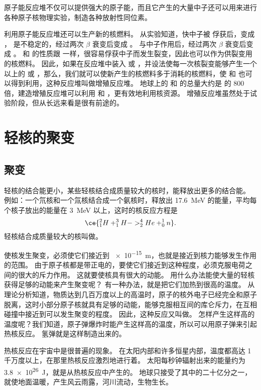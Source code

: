 原子能反应堆不仅可以提供强大的原子能，而且它产生的大量中子还可以用来进行各种原子核物理实验，制造各种放射性同位素。

利用原子能反应堆还可以生产新的核燃料。
从实验知道，快中子被  俘获后，变成 ，  是不稳定的，经过两次 $\beta$ 衰变后变成 。
 与中子作用后，经过两次 $\beta$ 衰变后变成 。
 和  的性质跟  一样，很容易俘获中子而发生裂变，因此也可以作为供裂变用的核燃料。
因此，如果在反应堆中装入  或 ，并设法使每一次核裂变能够产生一个以上的  或 ，那么，我们就可以使新产生的核燃料多于消耗的核燃料，使  和  也可以得到利用，这种反应堆叫做增殖反应堆。
地球上的  和  的总量大约是  的 800 倍，建造增殖反应堆可以利用  和 ，更有效地利用核资源。
增殖反应堆虽然处于试验阶段，但从长远来看是很有前途的。

\section{轻核的聚变}
\subsection{聚变}
轻核的结合能更小，某些轻核结合成质量较大的核时，能释放出更多的结合能。
例如：一个氘核和一个氚核结合成一个氨核时，释放出 \qty{17.6}{MeV} 的能量，平均每个核子放出的能量在 \qty{3}{MeV} 以上，这时的核反应方程是
\[ \ce{ ^2_1H + ^3_1H -> ^4_2He + ^1_0n }.\]
轻核结合成质量较大的核叫做。

使核发生聚变，必须使它们接近到 \qty{e-15}{m}，也就是接近到核力能够发生作用的范围。
由于原子核都是带正电的，要使它们接近到这种程度，必须克服电荷之间的很大的斥力作用。
这就要使核具有很大的动能。
用什么办法能使大量的轻核获得足够的动能来产生聚变呢？
有一种办法，就是把它们加热到很高的温度。
从理论分析知道，物质达到几百万度以上的高温时，原子的核外电子已经完全和原子脱离，这时小部分原子核就具有足够的动能，能够克服相互间的库仑斥力，在互相碰撞中接近到可以发生聚变的程度。
因此，这种反应又叫做。
怎样产生这样高的温度呢？我们知道，原子弹爆炸时能产生这样高的温度，所以可以用原子弹来引起热核反应。
氢弹就是这样制造出来的。

热核反应在宇宙中是很普遍的现象。
在太阳内部和许多恒星内部，温度都高达 1 千万度以上，在那里热核反应激烈地进行着。
太阳每秒钟辐射出来的能量约为 \qty{3.8e26}{J}，就是从热核反应中产生的。
地球只接受了其中的二十亿分之一，就使地面温暖，产生风云雨露，河川流动，生物生长。

